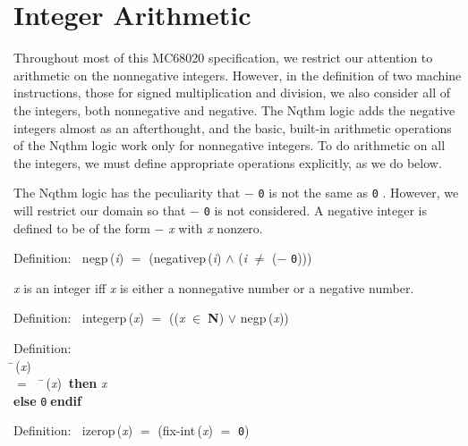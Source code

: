  \section{Integer Arithmetic}

 Throughout most of this MC68020 specification, we restrict our attention to
 arithmetic on the nonnegative integers.  However, in the definition of two
 machine instructions, those for signed multiplication and division, we also
 consider all of the integers, both nonnegative and negative.  The Nqthm
 logic adds the negative integers almost as an afterthought, and the basic,
 built-in arithmetic operations of the Nqthm logic work only for nonnegative
 integers.  To do arithmetic on all the integers, we must define appropriate
 operations explicitly, as we do below.
 
 The Nqthm logic has the peculiarity that $-$ {\tt{0}} is not the same as {\tt{0}} .
 However, we will restrict our domain so that $-$ {\tt{0}} is not considered.
 A negative integer is defined to be of the form $-$ {\it{x\/}} with {\it{x\/}} nonzero.
\begin{tabbing}{\sc Definition}:$\;\;$
{\rm{negp}}\,({\it{i\/}}) $=$ ({\rm{negativep}}\,({\it{i\/}}) $\wedge$ ({\it{i\/}} $\not=$ ($-$ {\tt{0}})))
\end{tabbing}

 {\it{x\/}} is an integer iff {\it{x\/}} is either a nonnegative number or a negative number.
\begin{tabbing}{\sc Definition}:$\;\;$
{\rm{integerp}}\,({\it{x\/}}) $=$ (({\it{x\/}} $\in\;${\bf{N}}${}$) $\vee$ {\rm{negp}}\,({\it{x\/}}))
\end{tabbing}

\begin{tabbing}{\sc Definition}: \\  
\=\,({\it{x\/}}) \\ 
$=$$\;\;\;\;$\=\,({\it{x\/}})$\;\;${\bf then }{\it{x\/}} \\ 
{\bf else }{\tt{0}}$\;${\bf  endif}\-\-
\end{tabbing}

\begin{tabbing}{\sc Definition}:$\;\;$
{\rm{izerop}}\,({\it{x\/}}) $=$ ({\rm{fix-int}}\,({\it{x\/}}) $=$ {\tt{0}})
\end{tabbing}

